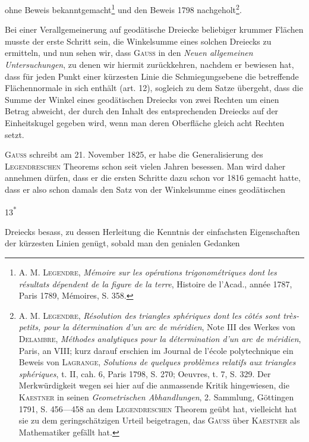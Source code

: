 ohne Beweis bekanntgemacht\footnote{\textsc{A. M. Legendre}, \textit{Mémoire sur les opérations trigonométriques dont les résultats dépendent de la figure de la terre}, Histoire de l’Acad., année 1787, Paris 1789, Mémoires, S. 358.} und den Beweis 1798 nachgeholt\footnote{\textsc{A. M. Legendre}, \textit{Résolution des triangles sphériques dont les côtés sont très-petits, pour la détermination d’un arc de méridien}, Note III des Werkes von \textsc{Delambre}, \textit{Méthodes analytiques pour la détermination d’un arc de méridien}, Paris, an VIII; kurz darauf erschien im Journal de l’école polytechnique ein Beweis von \textsc{Lagrange}, \textit{Solutions de quelques problèmes relatifs aux triangles sphériques}, t. II, cah. 6, Paris 1798, S. 270; Oeuvres, t. 7, S. 329. Der Merkwürdigkeit wegen sei hier auf die anmassende Kritik hingewiesen, die \textsc{Kaestner} in seinen \textit{Geometrischen Abhandlungen}, 2. Sammlung, Göttingen 1791, S. 456—458 an dem \textsc{Legendreschen} Theorem geübt hat, vielleicht hat sie zu dem geringschätzigen Urteil beigetragen, das \textsc{Gauss} über \textsc{Kaestner} als Mathematiker gefällt hat.}.
\par
Bei einer Verallgemeinerung auf geodätische Dreiecke beliebiger krummer
Flächen musste der erste Schritt sein, die Winkelsumme eines solchen Dreiecks
zu ermitteln, und nun sehen wir, dass \textsc{Gauss} in den \textit{Neuen allgemeinen
Untersuchungen}, zu denen wir hiermit zurückkehren, nachdem er bewiesen
hat, dass für jeden Punkt einer kürzesten Linie die Schmiegungsebene die
betreffende Flächennormale in sich enthält (art. 12), sogleich zu dem Satze
übergeht, dass die Summe der Winkel eines geodätischen Dreiecks von zwei
Rechten um einen Betrag abweicht, der durch den Inhalt des entsprechenden
Dreiecks auf der Einheitskugel gegeben wird, wenn man deren Oberfläche
gleich acht Rechten setzt.
\par
\textsc{Gauss} schreibt am 21. November 1825, er habe die Generalisierung des
\textsc{Legendreschen} Theorems schon seit vielen Jahren besessen. Man wird daher
annehmen dürfen, dass er die ersten Schritte dazu schon vor 1816 gemacht
hatte, dass er also schon damals den Satz von der Winkelsumme eines geodätischen
\par\smallskip\noindent\hfill13\textsuperscript{*}\par
\clearpage{}\setcounter{footnote}{0}
\noindent Dreiecks besass, zu dessen Herleitung die Kenntnis der einfachsten
Eigenschaften der kürzesten Linien genügt, sobald man den genialen Gedanken
